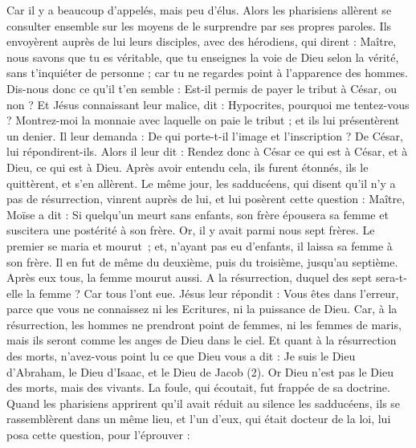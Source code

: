 \begin{multicols}{2}
{Car il y a beaucoup d'appelés, mais peu d'élus.
Alors les pharisiens allèrent se consulter ensemble sur les moyens de le surprendre par ses propres paroles.
Ils envoyèrent auprès de lui leurs disciples, avec des hérodiens, qui dirent : Maître, nous savons que tu es véritable, que tu enseignes la voie de Dieu selon la vérité, sans t’inquiéter de personne ; car tu ne regardes point à l'apparence des hommes.
Dis-nous donc ce qu'il t’en semble : Est-il permis de payer le tribut à César, ou non ?
Et Jésus connaissant leur malice, dit : Hypocrites, pourquoi me tentez-vous ?
Montrez-moi la monnaie avec laquelle on paie le tribut ; et ils lui présentèrent un denier.
Il leur demanda : De qui porte-t-il l’image et l’inscription ?
De César, lui répondirent-ils. Alors il leur dit : Rendez donc à César ce qui est à César, et à Dieu, ce qui est à Dieu.
Après avoir entendu cela, ils furent étonnés, ils le quittèrent, et s’en allèrent.
Le même jour, les sadducéens, qui disent qu'il n'y a pas de résurrection, vinrent auprès de lui, et lui posèrent cette question :
Maître, Moïse a dit : Si quelqu'un meurt sans enfants, son frère épousera sa femme et suscitera une postérité à son frère.
Or, il y avait parmi nous sept frères. Le premier se maria et mourut ; et, n'ayant pas eu d'enfants, il laissa sa femme à son frère.
Il en fut de même du deuxième, puis du troisième, jusqu’au septième.
Après eux tous, la femme mourut aussi.
A la résurrection, duquel des sept sera-t-elle la femme ? Car tous l'ont eue.
Jésus leur répondit : Vous êtes dans l’erreur, parce que vous ne connaissez ni les Ecritures, ni la puissance de Dieu.
Car, à la résurrection, les hommes ne prendront point de femmes, ni les femmes de maris, mais ils seront comme les anges de Dieu dans le ciel.
Et quant à la résurrection des morts, n'avez-vous point lu ce que Dieu vous a dit :
Je suis le Dieu d'Abraham, le Dieu d'Isaac, et le Dieu de Jacob (2). Or Dieu n'est pas le Dieu des morts, mais des vivants.
La foule, qui écoutait, fut frappée de sa doctrine.
Quand les pharisiens apprirent qu'il avait réduit au silence les sadducéens, ils se rassemblèrent dans un même lieu,
et l'un d'eux, qui était docteur de la loi, lui posa cette question, pour l'éprouver :
}
\end{multicols}

